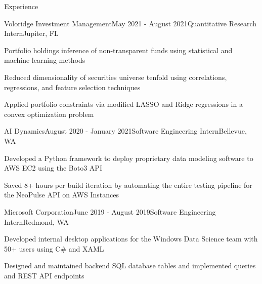 \documentclass{resume} %
\begin{document}
\begin{rSection}{Experience}
\begin{rSubsection}{Voloridge Investment Management}{May 2021 - August 2021}{Quantitative Research Intern}{Jupiter, FL}
    \item Portfolio holdings inference of non-transparent funds using statistical and machine learning methods
    \item Reduced dimensionality of securities universe tenfold using correlations, regressions, and feature selection techniques
    \item Applied portfolio constraints via modified LASSO and Ridge regressions in a convex optimization problem
\end{rSubsection}

\begin{rSubsection}{AI Dynamics}{August 2020 - January 2021}{Software Engineering Intern}{Bellevue, WA}
    \item Developed a Python framework to deploy proprietary data modeling software to AWS EC2 using the Boto3 API
    \item Saved 8+ hours per build iteration by automating the entire testing pipeline for the NeoPulse API on AWS Instances
\end{rSubsection}

\begin{rSubsection}{Microsoft Corporation}{June 2019 - August 2019}{Software Engineering Intern}{Redmond, WA}
    \item Developed internal desktop applications for the Windows Data Science team with 50+ users using C\# and XAML
    \item Designed and maintained backend SQL database tables and implemented queries and REST API endpoints
\end{rSubsection}

\end{rSection}

\end{document}

